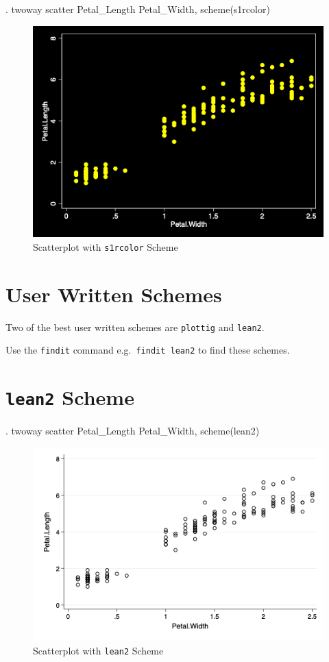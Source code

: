 \documentclass[
]{article}
\begin{document}
\begin{stlog}
. twoway scatter Petal_Length Petal_Width, scheme(s1rcolor)
\end{stlog}



\begin{figure}
\centering
\includegraphics[width=0.75\linewidth]{s1rcolorscatter.png}
\caption{Scatterplot with \texttt{s1rcolor} Scheme}
\end{figure}

\hypertarget{user-written-schemes}{%
\section{User Written Schemes}\label{user-written-schemes}}

Two of the best user written schemes are \texttt{plottig} and
\texttt{lean2}.

Use the \texttt{findit} command e.g.~\texttt{findit\ lean2} to find
these schemes.

\hypertarget{lean2-scheme}{%
\section{\texorpdfstring{\texttt{lean2}
Scheme}{lean2 Scheme}}\label{lean2-scheme}}

\begin{stlog}
. twoway scatter Petal_Length Petal_Width, scheme(lean2)
\end{stlog}



\begin{figure}
\centering
\includegraphics[width=0.75\linewidth]{lean2scatter.png}
\caption{Scatterplot with \texttt{lean2} Scheme}
\end{figure}
\end{document}
